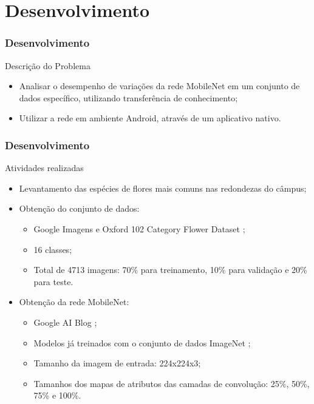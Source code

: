 \documentclass{beamer}
\begin{document}
    \section{Desenvolvimento}    
    \begin{frame}[t]
      \frametitle{Desenvolvimento}
      Descrição do Problema \bigskip
      \begin{itemize}    
			\item Analisar o desempenho de variações da rede MobileNet em um conjunto de dados específico, utilizando transferência de conhecimento; \bigskip
            \item Utilizar a rede em ambiente Android, através de um aplicativo nativo.
            \end{itemize}
    \end{frame}
    
    
    \begin{frame}[t]
      \frametitle{Desenvolvimento}
      Atividades realizadas      
      \begin{itemize}
        \item<1-> Levantamento das espécies de flores mais comuns nas redondezas do câmpus; \medskip
	    \item<2-> Obtenção do conjunto de dados:
	    		\begin{itemize}
	    			\item<2-> Google Imagens e Oxford 102 Category Flower Dataset \cite{oxford};
	    			\item<2-> 16 classes;
	    			\item<3-> Total de 4713 imagens: 70\% para treinamento, 10\% para validação e 20\% para teste. \medskip
	    		\end{itemize}
        \item<4-> Obtenção da rede MobileNet: 
        		\begin{itemize}
	    			\item<4-> Google AI Blog \cite{googleaiblog};
	    			\item<4-> Modelos já treinados com o conjunto de dados ImageNet \cite{imagenet}; 
				\item<5-> Tamanho da imagem de entrada: 224x224x3;
				\item<5-> Tamanhos dos mapas de atributos das camadas de convolução: 25\%, 50\%, 75\% e 100\%.\medskip    		
	    		\end{itemize}     
      \end{itemize}
    \end{frame}
    
\end{document}
